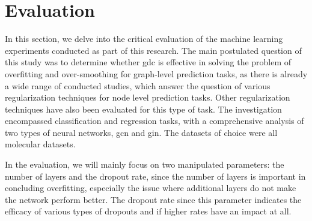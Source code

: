 %
\chapter{Evaluation}
\label{sec:eval}

In this section, we delve into the critical evaluation of the machine learning experiments conducted as part of this research.
The main postulated question of this study was to determine whether \ac{gdc} is effective in solving the problem of overfitting and over-smoothing for graph-level prediction tasks, as there is already a wide range of conducted studies, which answer the question of various regularization techniques for node level prediction tasks. Other regularization techniques have also been evaluated for this type of task.
The investigation encompassed classification and regression tasks, with a comprehensive analysis of two types of neural networks, \ac{gcn} and \ac{gin}.
The datasets of choice were all molecular datasets.

In the evaluation, we will mainly focus on two manipulated parameters: the number of layers and the dropout rate, since the number of layers is important in concluding overfitting, especially the issue where additional layers do not make the network perform better. The dropout rate since this parameter indicates the efficacy of various types of dropouts and if higher rates have an impact at all.

